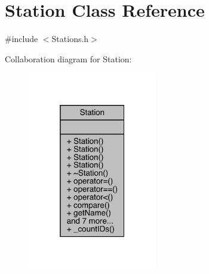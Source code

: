 \hypertarget{class_station}{}\section{Station Class Reference}
\label{class_station}


{\ttfamily \#include $<$Stations.\+h$>$}



Collaboration diagram for Station\+:\nopagebreak
\begin{figure}[H]
\begin{center}
\leavevmode
\includegraphics[width=160pt]{class_station__coll__graph}
\end{center}
\end{figure}
